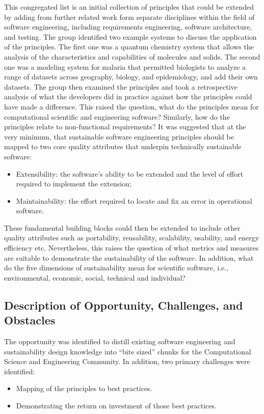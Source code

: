 This congregated list is an initial collection of principles that could be extended by adding from further related work form separate disciplines within the field of software engineering, including requirements engineering, software architecture, and testing. The group identified two example systems to discuss the application of the principles. The first one was a quantum chemistry system that allows the analysis of the characteristics and capabilities of molecules and solids. The second one was a modeling system for malaria that permitted biologists to analyze a range of datasets across geography, biology, and epidemiology, and add their own datasets. The group then examined the principles and took a retrospective analysis of what the developers did in practice against how the principles could have made a difference. This raised the question, what do the principles mean for  computational scientific and engineering software? Similarly, how do the principles relate to non-functional requirements? It was suggested that at the very minimum, that sustainable software engineering principles should be mapped to two core quality attributes that underpin technically sustainable software:
\begin{itemize}
\item Extensibility: the software's ability to be extended and the level of effort required to implement the extension;
\item Maintainability: the effort required to locate and fix an error in operational software.
\end{itemize}
These fundamental building blocks could then be extended to include other quality attributes such as portability, reusability, scalability, usability, and energy efficiency etc. Nevertheless, this raises the question of what metrics and measures are suitable to demonstrate the sustainability of the software. In addition, what do the five dimensions of sustainability mean for scientific software, i.e., environmental, economic, social, technical and individual?


\subsection{Description of Opportunity, Challenges, and Obstacles}
The opportunity was identified to distill existing software engineering and sustainability design knowledge into ``bite sized'' chunks for the Computational Science and Engineering Community. In addition, two primary challenges were identified:
\begin{itemize}
\item Mapping of the principles to best practices.
\item Demonstrating the return on investment of those best practices.
\end{itemize}

